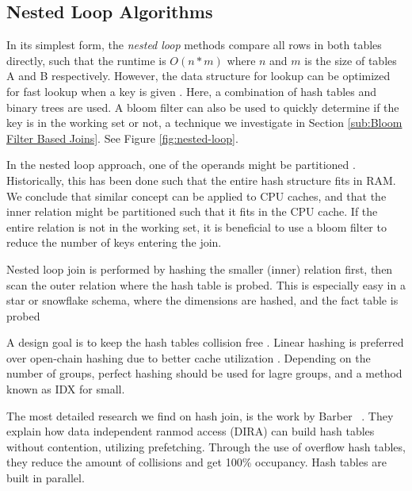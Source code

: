 \subsection{Nested Loop Algorithms}
\label{sub:Nested Loop Algorithms}
In its simplest form, the \textit{nested loop} methods compare all rows in both tables directly, such that the runtime is $O(n*m)$ where $n$ and $m$ is the size of tables A and B respectively. However, the data structure for lookup can be optimized for fast lookup when a key is given \cite{Bratbergsengen2015-ed}. Here, a combination of hash tables and binary trees are used. A bloom filter can also be used to quickly determine if the key is in the working set or not, a technique we investigate in Section \ref{sub:Bloom Filter Based Joins}. See Figure \ref{fig:nested-loop}.

In the nested loop approach, one of the operands might be partitioned \cite{Bratbergsengen2015-ed}. Historically, this has been done such that the entire hash structure fits in RAM. We conclude that similar concept can be applied to CPU caches, and that the inner relation might be partitioned such that it fits in the CPU cache. If the entire relation is not in the working set, it is beneficial to use a bloom filter to reduce the number of keys entering the join.  

Nested loop join is performed by hashing the smaller (inner) relation first, then scan the outer relation where the hash table is probed. This is especially easy in a star or snowflake schema, where the dimensions are hashed, and the fact table is probed \cite{Barber2012-xt, Raman2013-em}

A design goal is to keep the hash tables collision free \cite{Raman2013-em, Raman2008-gi}. Linear hashing is preferred over open-chain hashing due to better cache utilization \cite{Raman2008-gi}. Depending on the number of groups, perfect hashing should be used for lagre groups, and a method known as IDX for small.

The most detailed research we find on hash join, is the work by Barber \ea~\cite{Barber2014-ey}. They explain how data independent ranmod access (DIRA) can build hash tables without contention, utilizing prefetching. Through the use of overflow hash tables, they reduce the amount of collisions and get 100\% occupancy. Hash tables are built in parallel.

